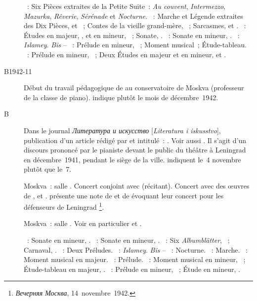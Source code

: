 \begin{description}
 \textsc{\Borodine{}}~: Six Pièces extraites de la Petite Suite~: \emph{Au
 couvent}, \emph{Intermezzo}, \emph{Mazurka}, \emph{Rêverie},
 \emph{Sérénade} et \emph{Nocturne}.
 \textsc{\Prokofiev{}}~: Marche et Légende extraites des Dix Pièces,
   et ~; Contes de la vieille grand-mère,
 ~; Sarcasmes,   et .
 \textsc{\Scriabine{}}~: Études en \kA \Flat majeur,  , et
 en \kG \Sharp mineur,  ~; Sonate, .
 \textsc{\Glazounov{}}~: Sonate en \kB \Flat mineur, .
 \textsc{\Balakirev{}}~: \emph{Islamey}.
 \emph{Bis} -- \textsc{\Rachmaninov{}}~: Prélude en \kC \Sharp mineur,
  ~; Moment musical~; Étude-tableau.
 \textsc{\Scriabine{}}~: Prélude en \kC \Sharp mineur, 
 ~; Deux Études en \kD \Flat majeur et en \kD \Sharp mineur,
   et .
 \item[B1942-11]
 Début du travail pédagogique de \VSofronitsky{} au conservatoire de Moskva
 (professeur de la classe de piano).
 \citet[p.~214]{Zhukova08} indique plutôt le mois de décembre~1942.
 \item[B\DateWithWeekDay{1942-11-07}]
 Dans le journal \foreignlanguage{russian}{\emph{Литература и искусство}}
 [\emph{Literatura i iskusstvo}], publication d'un article rédigé par
 \VSofronitsky{} et intitulé~: .
 Voir aussi \citet{Sofronitsky61}.
 Il s'agit d'un discours prononcé par le pianiste devant le public du
 théâtre \Pouchkine{} à Leningrad en décembre~1941, pendant le siège de la
 ville.
 \citet[p.~420]{Scriabine} indiquent le~4 novembre plutôt que le~7.
 \item[\DateWithWeekDay{1942-11-15}]
 Moskva~: salle \Tchaikovski{}.
 Concert conjoint avec \DZhuravlev{} (récitant).
 Concert avec des œuvres de \Prokofiev{}, \Chostakovitch{} et \Scriabine{}.
 \citet{Lazarev20} présente une note de \VSofronitsky{} et de \DZhuravlev{}
 évoquant leur concert pour les défenseurs de Leningrad%
 \footnote{\foreignlanguage{russian}{\emph{Вечерняя Москва}},
 14~novembre~1942.}.
 \item[\DateWithWeekDay{1942-12-27}]
 Moskva~: salle \Tchaikovski{}.
 Voir en particulier \citet[p.~442]{Milshteyn82a} et
 \citet[p.~394]{Nikonovich08}.

 \textsc{\Beethoven{}}~: Sonate en \kF mineur, .
 \textsc{\Chopin{}}~: Sonate en \kB \Flat mineur, .
 \textsc{\Schumann{}}~: Six \emph{Albumblätter}, ~; Carnaval,
 .
 \textsc{\Liadov{}}~: Deux Préludes.
 \textsc{\Balakirev{}}~: \emph{Islamey}.
 \emph{Bis} -- \textsc{\Glinka{}}~: Nocturne.
 \textsc{\Prokofiev{}}~: Marche.
 \textsc{\Schubert{}}~: Moment musical en \kA \Flat majeur.
 \textsc{\Chostakovitch{}}~: Prélude.
 \textsc{\Rachmaninov{}}~: Moment musical en \kE \Flat mineur, 
 ~; Étude-tableau en \kE \Flat majeur,  .
 \textsc{\Scriabine{}}~: Prélude en \kE \Flat mineur,  ~;
 Étude en \kD \Sharp mineur,  .
\end{description}

